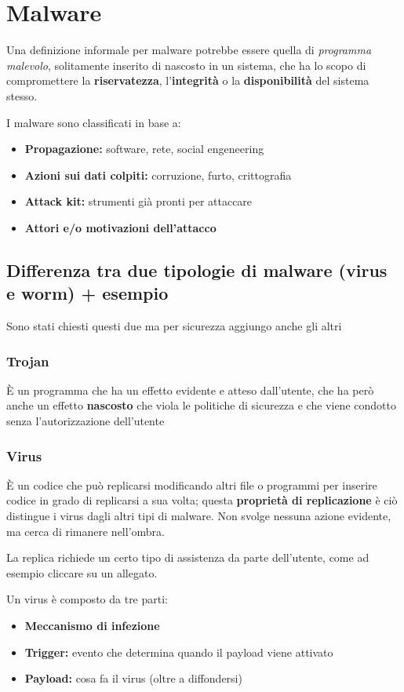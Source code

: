 \documentclass{report}
\begin{document}
\chapter{Malware}
\noindent Una definizione informale per malware potrebbe essere quella di \textit{programma malevolo},
solitamente inserito di nascosto in un sistema, che ha lo scopo di compromettere la \textbf{riservatezza}, l'\textbf{integrità} o la \textbf{disponibilità} 
del sistema stesso.

\noindent I malware sono classificati in base a:
\begin{itemize}
    \item \textbf{Propagazione:} software, rete, social engeneering
    \item \textbf{Azioni sui dati colpiti:} corruzione, furto, crittografia
    \item \textbf{Attack kit:} strumenti già pronti per attaccare
    \item \textbf{Attori e/o motivazioni dell'attacco}
\end{itemize}

\section{Differenza tra due tipologie di malware (virus e worm) + esempio}
\noindent Sono stati chiesti questi due ma per sicurezza aggiungo anche gli altri
\subsection{Trojan}
È un programma che ha un effetto evidente e atteso dall'utente, che ha però anche un 
effetto \textbf{nascosto} che viola le politiche di sicurezza e che viene condotto senza l'autorizzazione 
dell'utente

\subsection{Virus}
È un codice che può replicarsi modificando altri file o programmi per inserire codice in 
grado di replicarsi a sua volta; questa \textbf{proprietà di replicazione} è ciò distingue 
i virus dagli altri tipi di malware. Non svolge nessuna azione evidente, ma cerca di rimanere 
nell'ombra.

\noindent La replica richiede un certo tipo di assistenza da parte dell'utente, come ad esempio
cliccare su un allegato.

\noindent Un virus è composto da tre parti:
\begin{itemize}
    \item \textbf{Meccanismo di infezione}
    \item \textbf{Trigger:} evento che determina quando il payload viene attivato
    \item \textbf{Payload:} cosa fa il virus (oltre a diffondersi)
\end{itemize}
\end{document}
